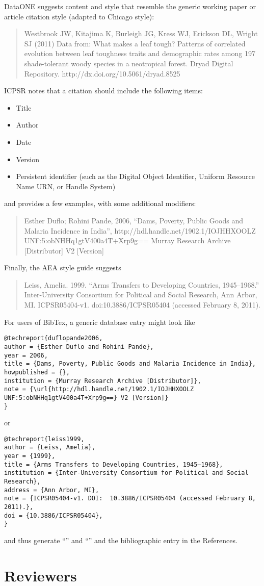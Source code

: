 \documentclass[AEJ]{AEA}
\begin{document}
DataONE \citep{dataone-cite} suggests content and style that resemble the generic working paper or article citation style (adapted to Chicago style):
\begin{quote}
    Westbrook JW, Kitajima K, Burleigh JG, Kress WJ, Erickson DL, Wright SJ (2011) Data from: What makes a leaf tough? Patterns of correlated evolution between leaf toughness traits and demographic rates among 197 shade-tolerant woody species in a neotropical forest. Dryad Digital Repository. http://dx.doi.org/10.5061/dryad.8525
\end{quote}
ICPSR \citep{icpsr-data-cite} notes  that a citation should include the following items:
\begin{itemize}
    \item   Title
    \item   Author
    \item   Date
    \item   Version
    \item   Persistent identifier (such as the Digital Object Identifier, Uniform Resource Name URN, or Handle System)
\end{itemize}
and provides a few examples, with some additional modifiers:
\begin{quote}
    Esther Duflo; Rohini Pande, 2006, ``Dams, Poverty, Public Goods and Malaria Incidence in India'', http://hdl.handle.net/1902.1/IOJHHXOOLZ UNF:5:obNHHq1gtV400a4T+Xrp9g== Murray Research Archive [Distributor] V2 [Version]
\end{quote}
Finally, the AEA style guide \citep{aeadatarefs} suggests
\begin{quote}
    Leiss, Amelia. 1999. ``Arms Transfers to Developing Countries, 1945–1968.'' 
    Inter-University Consortium for Political and Social Research, Ann Arbor, MI. 
    ICPSR05404-v1. doi:10.3886/ICPSR05404 (accessed February 8, 2011).
\end{quote}

For users of BibTex, a generic database entry might look like
\begin{verbatim}
@techreport{duflopande2006,
author = {Esther Duflo and Rohini Pande}, 
year = 2006, 
title = {Dams, Poverty, Public Goods and Malaria Incidence in India},
howpublished = {},
institution = {Murray Research Archive [Distributor]},
note = {\url{http://hdl.handle.net/1902.1/IOJHHXOOLZ UNF:5:obNHHq1gtV400a4T+Xrp9g==} V2 [Version]}
}
\end{verbatim}
or
\begin{verbatim}
@techreport{leiss1999,
author = {Leiss, Amelia},
year = {1999},
title = {Arms Transfers to Developing Countries, 1945–1968},
institution = {Inter-University Consortium for Political and Social Research}, 
address = {Ann Arbor, MI},
note = {ICPSR05404-v1. DOI:  10.3886/ICPSR05404 (accessed February 8, 2011).},
doi = {10.3886/ICPSR05404},
}
\end{verbatim}
and thus generate ``\cite{duflopande2006}'' and ``\cite{leiss1999}'' and the bibliographic entry in the References.




\appendix

\section{Reviewers}
\end{document}
